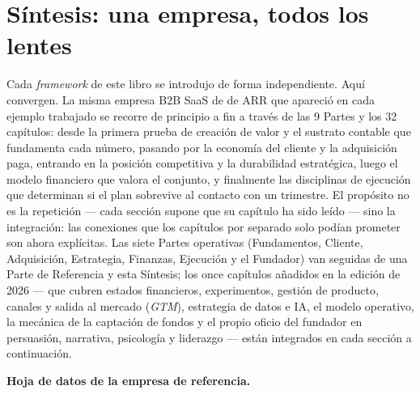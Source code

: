 \chapter{Síntesis: una empresa, todos los lentes}\label{ch:capstone}


Cada \emph{framework} de este libro se introdujo de forma independiente. Aquí convergen. La misma
empresa B2B SaaS de  de ARR que apareció en cada ejemplo trabajado se recorre
de principio a fin a través de las 9 Partes y los 32 capítulos: desde la primera prueba de
creación de valor y el sustrato contable que fundamenta cada número, pasando por la economía
del cliente y la adquisición paga, entrando en la posición competitiva y la durabilidad
estratégica, luego el modelo financiero que valora el conjunto, y finalmente las disciplinas de
ejecución que determinan si el plan sobrevive al contacto con un trimestre. El propósito no es
la repetición --- cada sección supone que su capítulo ha sido leído --- sino la integración:
las conexiones que los capítulos por separado solo podían prometer son ahora explícitas. Las
siete Partes operativas (Fundamentos, Cliente, Adquisición, Estrategia, Finanzas, Ejecución y
el Fundador) van seguidas de una Parte de Referencia y esta Síntesis; los once capítulos
añadidos en la edición de 2026 --- que cubren estados financieros, experimentos, gestión de
producto, canales y salida al mercado (\emph{GTM}), estrategia de datos e IA, el modelo
operativo, la mecánica de la captación de fondos y el propio oficio del fundador en
persuasión, narrativa, psicología y liderazgo --- están integrados en cada sección a
continuación.

\medskip
\noindent\textbf{Hoja de datos de la empresa de referencia.}

